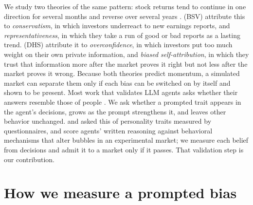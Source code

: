 \documentclass[10pt]{article}
\begin{document}
We study two theories of the same pattern: stock returns tend to continue in one direction for several months and reverse over several years \citep{jegadeesh1993returns}. \citet{barberis1998model} (BSV) attribute this to \emph{conservatism}, in which investors underreact to new earnings reports, and \emph{representativeness}, in which they take a run of good or bad reports as a lasting trend. \citet{daniel1998investor} (DHS) attribute it to \emph{overconfidence}, in which investors put too much weight on their own private information, and \emph{biased self-attribution}, in which they trust that information more after the market proves it right but not less after the market proves it wrong. Because both theories predict momentum, a simulated market can separate them only if each bias can be switched on by itself and shown to be present. Most work that validates LLM agents asks whether their answers resemble those of people \citep{argyle2023out,aher2023using,bisbee2024synthetic,gao2025caution,hu2024quantifying,henning2025llm}. We ask whether a prompted trait appears in the agent's decisions, grows as the prompt strengthens it, and leaves other behavior unchanged. \citet{serapio2023personality} and \citet{chittem2025sac} asked this of personality traits measured by questionnaires, and \citet{ouyang2026dissecting} score agents' written reasoning against behavioral mechanisms that alter bubbles in an experimental market; we measure each belief from decisions and admit it to a market only if it passes. That validation step is our contribution.

\section{How we measure a prompted bias}
\end{document}
